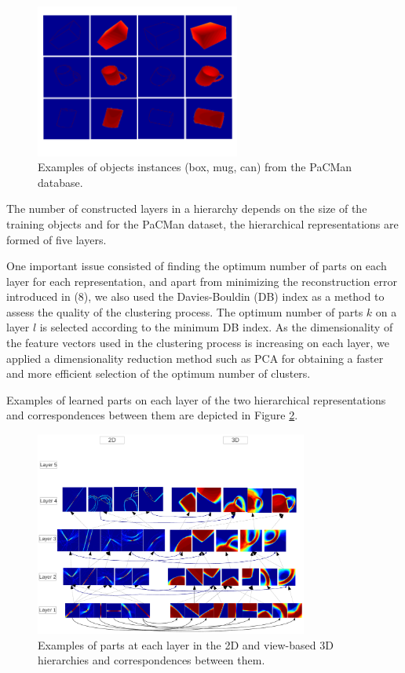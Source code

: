 \documentclass[runningheads]{llncs}
\begin{document}
\begin{figure}
\begin{center}
\includegraphics[width=0.6\textwidth]{database}
\end{center}
\caption{Examples of objects instances (box, mug, can) from the PaCMan database.}
\label{database}
\end{figure}

The number of constructed layers in a hierarchy depends on the size of the training objects and for the PaCMan dataset, the hierarchical representations are formed of five layers. 

One important issue consisted of finding the optimum number of parts on each layer for each representation, and apart from minimizing the reconstruction error introduced in (8), we also used the Davies-Bouldin (DB) index \cite{Bouldin97} as a method to assess the quality of the clustering process. The optimum number of parts $k$ on a layer $l$ is selected according to the minimum DB index. As the dimensionality of the feature vectors used in the clustering process is increasing on each layer, we applied a dimensionality reduction method such as PCA for obtaining a faster and more efficient selection of the optimum number of clusters.

Examples of learned parts on each layer of the two hierarchical representations and correspondences between them are depicted in Figure \ref{hierarchy}.

\begin{figure}
\begin{center}
\includegraphics[width=0.8\textwidth]{hierarchy}
\end{center}
\caption{Examples of parts at each layer in the 2D and view-based 3D hierarchies and correspondences between them.}
\label{hierarchy}
\end{figure}
\end{document}
